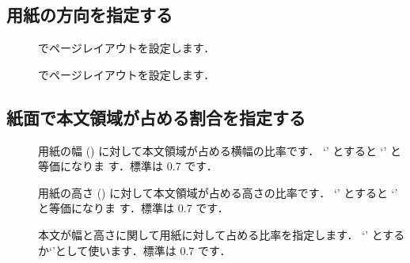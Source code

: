 
\subsection{用紙の方向を指定する}
\begin{description}
\item[] 
  でページレイアウトを設定します．
\item[]
  でページレイアウトを設定します．
\end{description}


\subsection{紙面で本文領域が占める割合を指定する}

\begin{description}
 \item[] 
  用紙の幅 () に対して本文領域が占める横幅の比率です．
  `' とすると `' と等価になりま
  す．標準は 0.7 です．
 \item[] 
  用紙の高さ () に対して本文領域が占める高さの比率です．
  `' とすると `' と等価になりま
  す．標準は 0.7 です．
 \item[] 
  本文が幅と高さに関して用紙に対して占める比率を指定します．
  `'
   とするか`'として使います．標準は 0.7 です．
\end{description}

